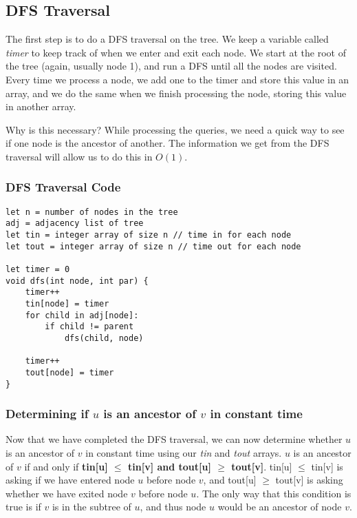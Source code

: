 \documentclass{article}
\begin{document}
\subsection{DFS Traversal}
The first step is to do a DFS traversal on the tree. We keep a variable called \textit{timer} to keep track of when we enter and exit each node. We start at the root of the tree (again, usually node 1), and run a DFS until all the nodes are visited. Every time we process a node, we add one to the timer and store this value in an array, and we do the same when we finish processing the node, storing this value in another array.

Why is this necessary? While processing the queries, we need a quick way to see if one node is the ancestor of another. The information we get from the DFS traversal will allow us to do this in $O(1)$.

\subsubsection{DFS Traversal Code}
\begin{lstlisting}
let n = number of nodes in the tree
adj = adjacency list of tree
let tin = integer array of size n // time in for each node
let tout = integer array of size n // time out for each node

let timer = 0
void dfs(int node, int par) {
	timer++
	tin[node] = timer
	for child in adj[node]:
		if child != parent
			dfs(child, node)
	
	timer++
	tout[node] = timer
}
\end{lstlisting}


\subsubsection{Determining if $u$ is an ancestor of $v$ in constant time}
Now that we have completed the DFS traversal, we can now determine whether $u$ is an ancestor of $v$ in constant time using our \textit{tin} and \textit{tout} arrays. $u$ is an ancestor of $v$ if and only if \textbf{tin[u] $\leq$ tin[v] and tout[u] $\geq$ tout[v]}. tin[u] $\leq$ tin[v] is asking if we have entered node $u$ before node $v$, and tout[u] $\geq$ tout[v] is asking whether we have exited node $v$ before node $u$. The only way that this condition is true is if $v$ is in the subtree of $u$, and thus node $u$ would be an ancestor of node $v$.
\end{document}
